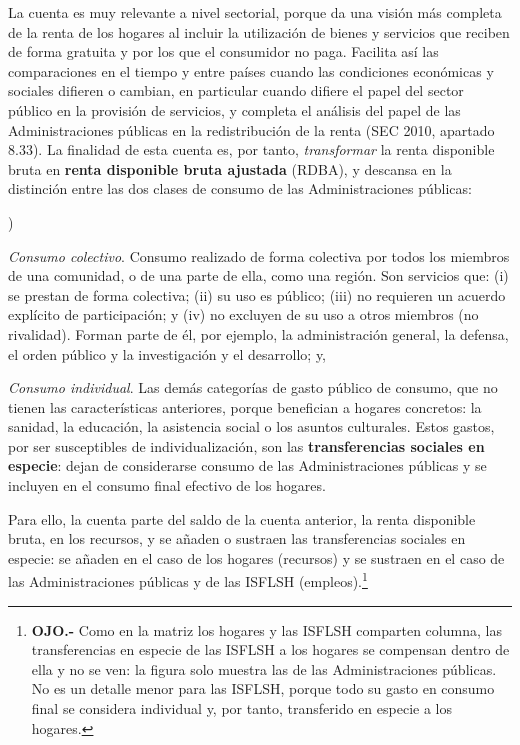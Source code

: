 \documentclass[10pt,a4paper]{article}
\newcounter{alphaitem}
\newenvironment{la}
      {\begin{list}{\alph{alphaitem})}{%
          \usecounter{alphaitem}%
          \setlength{\leftmargin}{1cm}%
          \setlength{\parskip}{3pt}%
          \setlength{\itemsep}{0pt}%
          \setlength{\parsep}{0pt}%
      }}
      {\end{list}}
\begin{document}
La cuenta es muy relevante a nivel sectorial, porque da una visión más completa de la renta de los hogares al incluir la utilización de bienes y servicios que reciben de forma gratuita y por los que el consumidor no paga. Facilita así las comparaciones en el tiempo y entre países cuando las condiciones económicas y sociales difieren o cambian, en particular cuando difiere el papel del sector público en la provisión de servicios, y completa el análisis del papel de las Administraciones públicas en la redistribución de la renta (SEC 2010, apartado 8.33). La finalidad de esta cuenta es, por tanto, \textit{transformar} la renta disponible bruta en \textbf{renta disponible bruta ajustada} (RDBA), y descansa en la distinción entre las dos clases de consumo de las Administraciones públicas:
\begin{la}
    \item \textit{Consumo colectivo}. Consumo realizado de forma colectiva por todos los miembros de una comunidad, o de una parte de ella, como una región. Son servicios que: (i) se prestan de forma colectiva; (ii) su uso es público; (iii) no requieren un acuerdo explícito de participación; y (iv) no excluyen de su uso a otros miembros (no rivalidad). Forman parte de él, por ejemplo, la administración general, la defensa, el orden público y la investigación y el desarrollo; y,
    \item \textit{Consumo individual}. Las demás categorías de gasto público de consumo, que no tienen las características anteriores, porque benefician a hogares concretos: la sanidad, la educación, la asistencia social o los asuntos culturales. Estos gastos, por ser susceptibles de individualización, son las \textbf{transferencias sociales en especie}: dejan de considerarse consumo de las Administraciones públicas y se incluyen en el consumo final efectivo de los hogares.
\end{la}

Para ello, la cuenta parte del saldo de la cuenta anterior, la renta disponible bruta, en los recursos, y se añaden o sustraen las transferencias sociales en especie: se añaden en el caso de los hogares (recursos) y se sustraen en el caso de las Administraciones públicas y de las ISFLSH (empleos).\footnote{%
    \textbf{OJO.-} Como en la matriz los hogares y las ISFLSH comparten columna, las transferencias en especie de las ISFLSH a los hogares se compensan dentro de ella y no se ven: la figura solo muestra las de las Administraciones públicas. No es un detalle menor para las ISFLSH, porque todo su gasto en consumo final se considera individual y, por tanto, transferido en especie a los hogares.
} 
\end{document}
